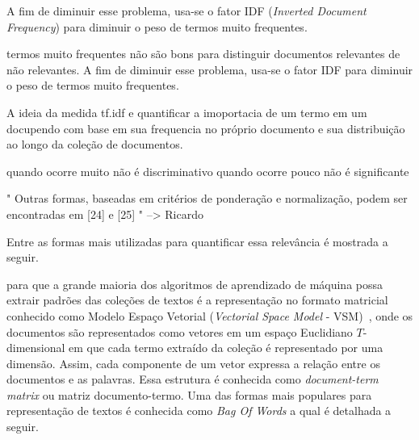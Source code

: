 A fim de diminuir esse problema, usa-se o fator IDF (\textit{Inverted Document Frequency}) para diminuir o peso de termos muito frequentes. 

termos muito frequentes não são bons para distinguir documentos relevantes de não relevantes. A fim de diminuir esse problema, usa-se o fator IDF para diminuir o peso de termos muito frequentes.


A ideia da medida tf.idf e quantificar a imoportacia de um termo em um docupendo com base em sua frequencia no próprio documento e sua distribuição ao longo da coleção de documentos.


quando ocorre muito não é discriminativo
quando ocorre pouco não é significante



" Outras formas, baseadas em critérios de
ponderação e normalização, podem ser encontradas em
[24] e [25] " --> Ricardo







Entre as formas mais utilizadas para quantificar essa relevância é mostrada a seguir. 

para que a grande maioria dos algoritmos de aprendizado de máquina possa extrair padrões das coleções de textos é a representação no formato matricial conhecido como Modelo Espaço Vetorial (\textit{Vectorial Space Model} - VSM)~\cite{Rezende2003}, onde os documentos são representados como vetores em um espaço Euclidiano $T$-dimensional em que cada termo extraído da coleção é representado por uma dimensão. Assim, cada componente de um vetor expressa a relação entre os documentos e as palavras. Essa estrutura é conhecida como \textit{document-term matrix} ou matriz documento-termo. Uma das formas mais populares para representação de textos é conhecida como \textit{Bag Of Words} a qual é detalhada a seguir.




















